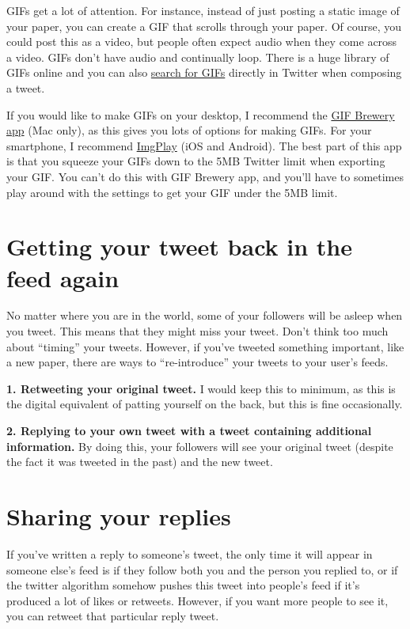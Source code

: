 \documentclass[]{book}
\begin{document}
GIFs get a lot of attention. For instance, instead of just posting a static image of your paper, you can create a GIF that scrolls through your paper. Of course, you could post this as a video, but people often expect audio when they come across a video. GIFs don't have audio and continually loop. There is a huge library of GIFs online and you can also \href{https://help.twitter.com/en/using-twitter/tweeting-gifs-and-pictures}{search for GIFs} directly in Twitter when composing a tweet.

If you would like to make GIFs on your desktop, I recommend the \href{https://gfycat.com/gifbrewery}{GIF Brewery app} (Mac only), as this gives you lots of options for making GIFs. For your smartphone, I recommend \href{https://imgplay.net/}{ImgPlay} (iOS and Android). The best part of this app is that you squeeze your GIFs down to the 5MB Twitter limit when exporting your GIF. You can't do this with GIF Brewery app, and you'll have to sometimes play around with the settings to get your GIF under the 5MB limit.

\hypertarget{getting-your-tweet-back-in-the-feed-again}{%
\section{Getting your tweet back in the feed again}\label{getting-your-tweet-back-in-the-feed-again}}

No matter where you are in the world, some of your followers will be asleep when you tweet. This means that they might miss your tweet. Don't think too much about ``timing'' your tweets. However, if you've tweeted something important, like a new paper, there are ways to ``re-introduce'' your tweets to your user's feeds.

\textbf{1. Retweeting your original tweet.} I would keep this to minimum, as this is the digital equivalent of patting yourself on the back, but this is fine occasionally.

\textbf{2. Replying to your own tweet with a tweet containing additional information.} By doing this, your followers will see your original tweet (despite the fact it was tweeted in the past) and the new tweet.

\hypertarget{sharing-your-replies}{%
\section{Sharing your replies}\label{sharing-your-replies}}

If you've written a reply to someone's tweet, the only time it will appear in someone else's feed is if they follow both you and the person you replied to, or if the twitter algorithm somehow pushes this tweet into people's feed if it's produced a lot of likes or retweets. However, if you want more people to see it, you can retweet that particular reply tweet.
\end{document}

